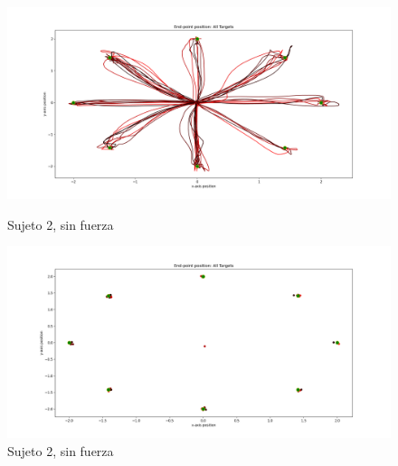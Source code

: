 \documentclass[a4paper,11pt, oneside]{book}
\begin{document}
\begin{figure}[H]
	\begin{minipage}[b]{0.5\linewidth}
		\centering
		\includegraphics[width=\linewidth]{sujeto2/no_force/trayectorias}
		\caption{Sujeto 2, sin fuerza}
		\label{2-fase1-1}
	\end{minipage}
	\hspace{0.5cm}
	\begin{minipage}[b]{0.5\linewidth}
		\centering
		\includegraphics[width=\linewidth]{sujeto2/no_force/trayectorias_puntos}
		\caption{Sujeto 2, sin fuerza}
		\label{2-fase1-2}
	\end{minipage}
\end{figure}
\end{document}
